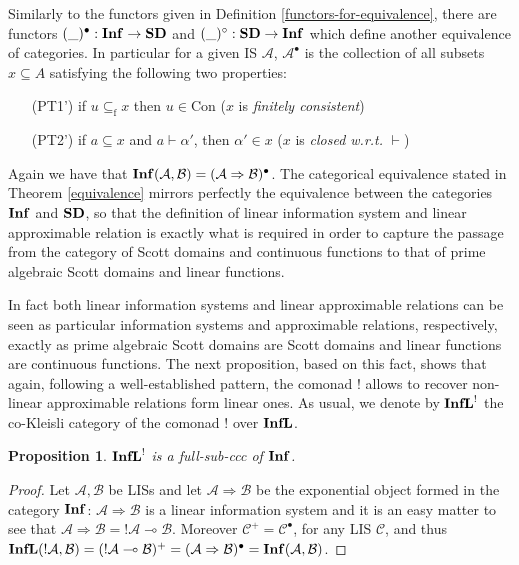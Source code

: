 \documentclass[copyright,creativecommons]{eptcs}
\newtheorem{proposition}[theorem]{Proposition}
\newcommand{\cA}{\mathcal{A}}
\newcommand{\cB}{\mathcal{B}}
\newcommand{\cC}{\mathcal{C}}
\newcommand{\rf}{\mathrm{f}}
\newcommand{\Con}{\mathrm{Con}} \newcommand{\Com}{\mathrm{Com}} \newcommand{\Sup}{\mathrm{Sup}} %
\begin{document}
Similarly to the functors given in Definition \ref{functors-for-equivalence}, there are functors $(\_ )^\bullet: \mathbf{Inf} \to \mathbf{SD}$ and \mbox{$(\_ )^\circ: \mathbf{SD} \to \mathbf{Inf}$} which define another equivalence of categories. In particular for a given IS $\cA$, $\cA^\bullet$ is the collection of all subsets $x \subseteq A$ satisfying the following two properties:
\begin{itemize}
\item[(PT1')] if $u \subseteq_\rf x$ then $u \in \Con$ ($x$ is \emph{finitely consistent})
\item[(PT2')] if $ a \subseteq x$ and $a \vdash \alpha'$, then $\alpha' \in x$ ($x$ is \emph{closed w.r.t.} $\vdash$)
\end{itemize}

Again we have that $\Inf(\cA, \cB) = (\cA \Rightarrow \cB)^\bullet$. The categorical equivalence stated in Theorem \ref{equivalence} mirrors perfectly the equivalence between the categories $\mathbf{Inf}$ and $\mathbf{SD}$, so that the definition of linear information system and linear approximable relation is exactly what is required in order to capture the passage from the category of Scott domains and continuous functions to that of prime algebraic Scott domains and linear functions.

In fact both linear information systems and linear approximable relations can be seen as particular information systems and approximable relations, respectively, exactly as prime algebraic Scott domains are Scott domains and linear functions are continuous functions. The next proposition, based on this fact, shows that again, following a well-established pattern, the comonad $!$ allows to recover non-linear approximable relations form linear ones. As usual, we denote by $\mathbf{InfL}^!$ the co-Kleisli category of the comonad $!$ over $\mathbf{InfL}$.

\begin{proposition}\label{co-Kleisli}
$\mathbf{InfL}^!$ is a full-sub-ccc of $\mathbf{Inf}$.
\end{proposition}

\begin{proof}
Let $\cA,\cB$ be LISs and let $\cA \Rightarrow \cB$ be the exponential object formed in the category $\mathbf{Inf}$: $\cA \Rightarrow \cB$ is a linear information system and it is an easy matter to see that $\cA \Rightarrow \cB = !\cA \multimap \cB$. Moreover $\cC^+ = \cC^\bullet$, for any LIS $\cC$, and thus \mbox{$\Infl(!\cA, \cB) = (!\cA \multimap \cB)^+ = (\cA \Rightarrow \cB)^\bullet = \Inf(\cA, \cB)$}.
\end{proof}
\end{document}
